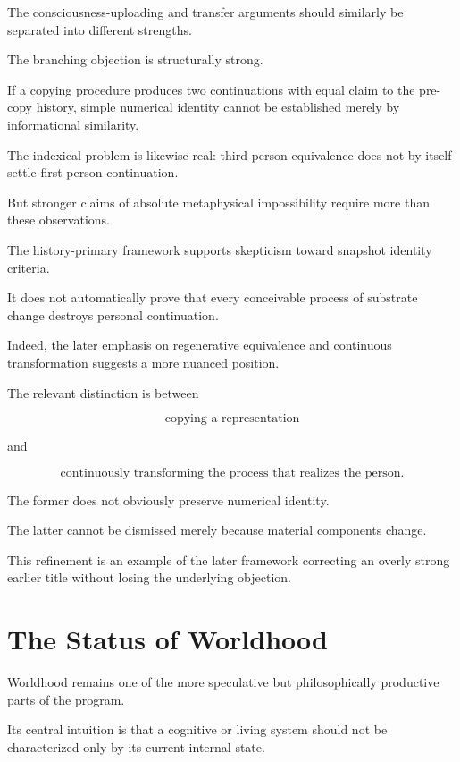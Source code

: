 \documentclass[11pt]{article}
\theoremstyle{remark}
\begin{document}
The consciousness-uploading and transfer arguments should similarly be
separated into different strengths.

The branching objection is structurally strong.

If a copying procedure produces two continuations with equal claim to the
pre-copy history, simple numerical identity cannot be established merely by
informational similarity.

The indexical problem is likewise real: third-person equivalence does not by
itself settle first-person continuation.

But stronger claims of absolute metaphysical impossibility require more than
these observations.

The history-primary framework supports skepticism toward snapshot identity
criteria.

It does not automatically prove that every conceivable process of substrate
change destroys personal continuation.

Indeed, the later emphasis on regenerative equivalence and continuous
transformation suggests a more nuanced position.

The relevant distinction is between

\begin{equation}
\text{copying a representation}
\end{equation}

and

\begin{equation}
\text{continuously transforming the process that realizes the person}.
\end{equation}

The former does not obviously preserve numerical identity.

The latter cannot be dismissed merely because material components change.

This refinement is an example of the later framework correcting an overly
strong earlier title without losing the underlying objection.

\section{The Status of Worldhood}

Worldhood remains one of the more speculative but philosophically productive
parts of the program.

Its central intuition is that a cognitive or living system should not be
characterized only by its current internal state.
\end{document}

